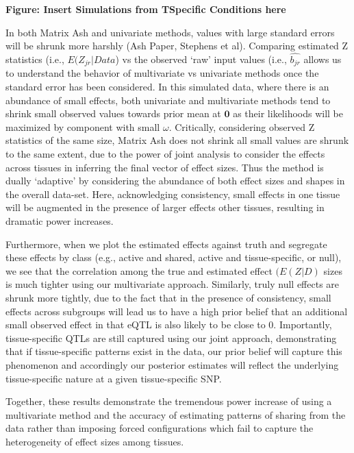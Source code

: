 {\textbf{Figure: Insert Simulations from TSpecific Conditions here}
\newline

In both Matrix Ash and univariate methods, values with large standard errors will be shrunk more harshly (Ash Paper, Stephens et al). Comparing estimated Z statistics (i.e., $E(Z_{jr}|Data$) vs the observed `raw' input values (i.e., $\hat{b_{jr}}$ allows us to understand the behavior of multivariate vs univariate methods once the standard error has been considered. In this simulated data, where there is an abundance of small effects, both univariate and multivariate methods tend to shrink small observed values towards prior mean at $\bm{0}$ as their likelihoods will be maximized by component with small $\omega$. Critically, considering observed Z statistics of the same size, Matrix Ash does not shrink all small values are shrunk to the same extent, due to the power of joint analysis to consider the effects across tissues in inferring the final vector of effect sizes. Thus the method is dually `adaptive' by considering the abundance of both effect sizes and shapes in the overall data-set.  Here, acknowledging consistency, small effects in one tissue will be augmented in the presence of larger effects  other tissues, resulting in dramatic power increases. 

Furthermore, when we plot the estimated effects against truth and segregate these effects by class (e.g., active and shared, active and tissue-specific, or null), we see that the correlation among the true and estimated effect $(E(Z|D)$ sizes is much tighter using our multivariate approach. Similarly, truly null effects are shrunk more tightly, due to the fact that in the presence of consistency, small effects across subgroups will lead us to have a high prior belief that an additional small observed effect in that eQTL is also likely to be close to 0. Importantly, tissue-specific QTLs are still captured using our joint approach, demonstrating that if tissue-specific patterns exist in the data, our prior belief will capture this phenomenon and accordingly our posterior estimates will reflect the underlying tissue-specific nature at a given tissue-specific SNP.

Together, these results demonstrate the tremendous power increase of using a multivariate method and the accuracy of estimating patterns of sharing from the data rather than imposing forced configurations which fail to capture the heterogeneity of effect sizes among tissues.


}
